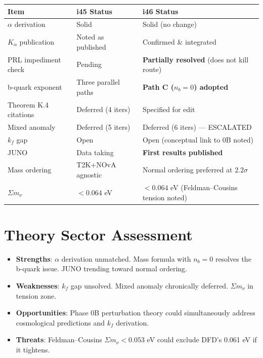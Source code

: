 \documentclass[11pt,a4paper]{article}
\begin{document}
\begin{center}
\begin{tabular}{lll}
\toprule
\textbf{Item} & \textbf{i45 Status} & \textbf{i46 Status} \\
\midrule
$\alpha$ derivation & Solid & Solid (no change) \\
$K_\alpha$ publication & Noted as published & Confirmed \& integrated \\
PRL impediment check & Pending & \textbf{Partially resolved} (does not kill route) \\
b-quark exponent & Three parallel paths & \textbf{Path C ($n_b = 0$) adopted} \\
Theorem K.4 citations & Deferred (4 iters) & Specified for edit \\
Mixed anomaly & Deferred (5 iters) & Deferred (6 iters) --- ESCALATED \\
$k_f$ gap & Open & Open (conceptual link to 0B noted) \\
JUNO & Data taking & \textbf{First results published} \\
Mass ordering & T2K+NOvA agnostic & Normal ordering preferred at $2.2\sigma$ \\
$\Sigma m_\nu$ & $< 0.064$ eV & $< 0.064$ eV (Feldman--Cousins tension noted) \\
\bottomrule
\end{tabular}
\end{center}

\section{Theory Sector Assessment}

\begin{itemize}
\item \textbf{Strengths}: $\alpha$ derivation unmatched. Mass formula with $n_b = 0$ resolves the b-quark issue. JUNO trending toward normal ordering.
\item \textbf{Weaknesses}: $k_f$ gap unsolved. Mixed anomaly chronically deferred. $\Sigma m_\nu$ in tension zone.
\item \textbf{Opportunities}: Phase 0B perturbation theory could simultaneously address cosmological predictions and $k_f$ derivation.
\item \textbf{Threats}: Feldman--Cousins $\Sigma m_\nu < 0.053$ eV could exclude DFD's 0.061 eV if it tightens.
\end{itemize}
\end{document}
